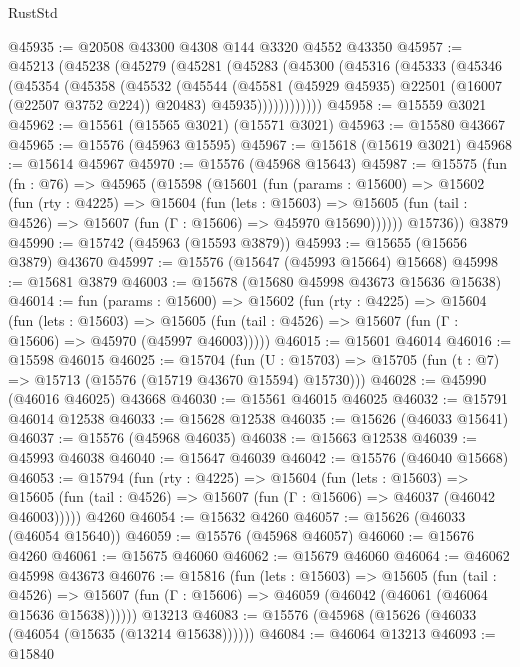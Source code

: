 \begin{lexlean}{RustStd}
\begin{coremodule}
@45935 := @20508 @43300 @4308 @144 @3320 @4552 @43350
@45957 := @45213
    (@45238
      (@45279
        (@45281
          (@45283
            (@45300
              (@45316
                (@45333
                  (@45346
                    (@45354
                      (@45358
                        (@45532
                          (@45544
                            (@45581 (@45929 @45935) @22501 (@16007 (@22507 @3752 @224)) @20483)
                            @45935))))))))))))
@45958 := @15559 @3021
@45962 := @15561 (@15565 @3021) (@15571 @3021)
@45963 := @15580 @43667
@45965 := @15576 (@45963 @15595)
@45967 := @15618 (@15619 @3021)
@45968 := @15614 @45967
@45970 := @15576 (@45968 @15643)
@45987 := @15575
    (fun (fn : @76) =>
    @45965
      (@15598
        (@15601
          (fun (params : @15600) =>
          @15602
            (fun (rty : @4225) =>
            @15604
              (fun (lets : @15603) =>
              @15605 (fun (tail : @4526) => @15607 (fun (Γ : @15606) => @45970 @15690))))))
        @15736))
    @3879
@45990 := @15742 (@45963 (@15593 @3879))
@45993 := @15655 (@15656 @3879) @43670
@45997 := @15576 (@15647 (@45993 @15664) @15668)
@45998 := @15681 @3879
@46003 := @15678 (@15680 @45998 @43673 @15636 @15638)
@46014 := fun (params : @15600) =>
  @15602
    (fun (rty : @4225) =>
    @15604
      (fun (lets : @15603) =>
      @15605 (fun (tail : @4526) => @15607 (fun (Γ : @15606) => @45970 (@45997 @46003)))))
@46015 := @15601 @46014
@46016 := @15598 @46015
@46025 := @15704
    (fun (U : @15703) => @15705 (fun (t : @7) => @15713 (@15576 (@15719 @43670 @15594) @15730)))
@46028 := @45990 (@46016 @46025) @43668
@46030 := @15561 @46015 @46025
@46032 := @15791 @46014 @12538
@46033 := @15628 @12538
@46035 := @15626 (@46033 @15641)
@46037 := @15576 (@45968 @46035)
@46038 := @15663 @12538
@46039 := @45993 @46038
@46040 := @15647 @46039
@46042 := @15576 (@46040 @15668)
@46053 := @15794
    (fun (rty : @4225) =>
    @15604
      (fun (lets : @15603) =>
      @15605 (fun (tail : @4526) => @15607 (fun (Γ : @15606) => @46037 (@46042 @46003)))))
    @4260
@46054 := @15632 @4260
@46057 := @15626 (@46033 (@46054 @15640))
@46059 := @15576 (@45968 @46057)
@46060 := @15676 @4260
@46061 := @15675 @46060
@46062 := @15679 @46060
@46064 := @46062 @45998 @43673
@46076 := @15816
    (fun (lets : @15603) =>
    @15605
      (fun (tail : @4526) =>
      @15607 (fun (Γ : @15606) => @46059 (@46042 (@46061 (@46064 @15636 @15638))))))
    @13213
@46083 := @15576 (@45968 (@15626 (@46033 (@46054 (@15635 (@13214 @15638))))))
@46084 := @46064 @13213
@46093 := @15840

\end{coremodule}
\end{lexlean}
